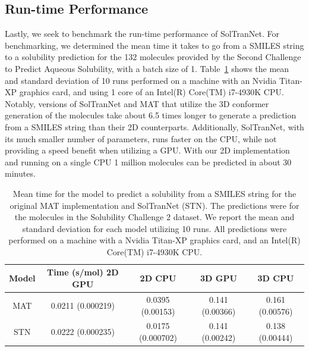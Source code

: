 \documentclass[journal=jmcmar,manuscript=article]{achemso}
\begin{document}
\subsection{Run-time Performance}

Lastly, we seek to benchmark the run-time performance of SolTranNet.
For benchmarking, we determined the mean time it takes to go from a SMILES string to a solubility prediction for the 132 molecules provided by the Second Challenge to Predict Aqueous Solubility, with a batch size of 1.
Table~\ref{tab:timings} shows the mean and standard deviation of 10 runs performed on a machine with an Nvidia Titan-XP graphics card, and using 1 core of an Intel(R) Core(TM) i7-4930K CPU.
Notably, versions of SolTranNet and MAT that utilize the 3D conformer generation of the molecules take about 6.5 times longer to generate a prediction from a SMILES string than their 2D counterparts.
Additionally, SolTranNet, with its much smaller number of parameters, runs faster on the CPU, while not providing a speed benefit when utilizing a GPU.
With our 2D implementation and running on a single CPU 1 million molecules can be predicted in about 30 minutes.


\begin{table}
    \begin{tabular}{|c|c|c|c|c|}
        \hline
         Model & Time (s/mol) 2D GPU & 2D CPU & 3D GPU & 3D CPU \\
         \hline
         MAT & 0.0211 (0.000219) & 0.0395 (0.00153) & 0.141 (0.00366) & 0.161 (0.00576) \\
         STN & 0.0222 (0.000235) & 0.0175 (0.000702) & 0.141 (0.00242) & 0.138 (0.00444) \\
         \hline
    \end{tabular}
    \caption{Mean time for the model to predict a solubility from a SMILES string for the original MAT implementation and SolTranNet (STN). The predictions were for the molecules in the Solubility Challenge 2 dataset. We report the mean and standard deviation for each model utilizing 10 runs. All predictions were performed on a machine with a Nvidia Titan-XP graphics card, and an Intel(R) Core(TM) i7-4930K CPU.}
    \label{tab:timings}
\end{table}
\end{document}
